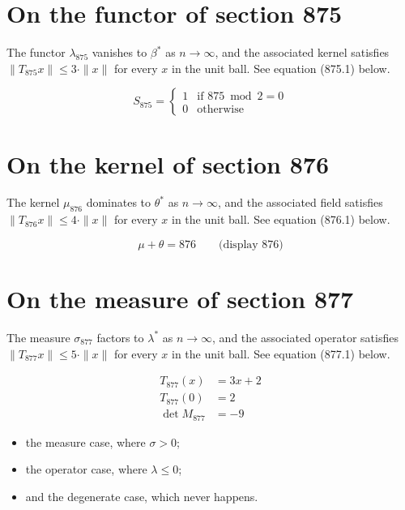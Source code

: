 \documentclass{article}
\begin{document}
\section{On the functor of section 875}
The functor $\lambda_{875}$ vanishes to $\beta^{*}$ as $n \to \infty$,
and the associated kernel satisfies $\|T_{875} x\| \leq 3 \cdot \|x\|$
for every $x$ in the unit ball. See equation (875.1) below.

\begin{equation}
S_{875} = \begin{cases} 1 & \text{if } 875 \bmod 2 = 0 \\ 0 & \text{otherwise} \end{cases}
\end{equation}

\section{On the kernel of section 876}
The kernel $\mu_{876}$ dominates to $\theta^{*}$ as $n \to \infty$,
and the associated field satisfies $\|T_{876} x\| \leq 4 \cdot \|x\|$
for every $x$ in the unit ball. See equation (876.1) below.

$$
\mu + \theta = 876 \qquad \text{(display 876)}
$$

\section{On the measure of section 877}
The measure $\sigma_{877}$ factors to $\lambda^{*}$ as $n \to \infty$,
and the associated operator satisfies $\|T_{877} x\| \leq 5 \cdot \|x\|$
for every $x$ in the unit ball. See equation (877.1) below.

\begin{align}
T_{877}(x) &= 3 x + 2 \\
T_{877}(0) &= 2 \\
\det M_{877} &= -9
\end{align}

\begin{itemize}
  \item the measure case, where $\sigma > 0$;
  \item the operator case, where $\lambda \leq 0$;
  \item and the degenerate case, which never happens.
\end{itemize}
\end{document}
